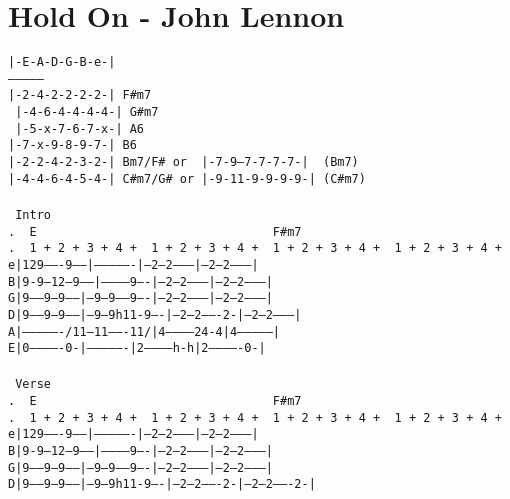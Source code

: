 \newpage
\section{Hold On - John Lennon}
\label{Hold On - John Lennon}
\texttt{|-E-A-D-G-B-e-|\\
---------------\\
|-2-4-2-2-2-2-| F\#m7\\\
|-4-6-4-4-4-4-| G\#m7\\\
|-5-x-7-6-7-x-| A6\ \ \\
|-7-x-9-8-9-7-| B6\ \ \\
|-2-2-4-2-3-2-| Bm7/F\# or\ \ |-7-9--7-7-7-7-|\ \ (Bm7)\\
|-4-4-6-4-5-4-| C\#m7/G\# or\ |-9-11-9-9-9-9-|\ (C\#m7)\\
\\
\lbrack\ Intro\rbrack\\
.\ \ E\ \ \ \ \ \ \ \ \ \ \ \ \ \ \ \ \ \ \ \ \ \ \ \ \ \ \ \ \ \ \ \ \ F\#m7\\
.\ \ 1\ +\ 2\ +\ 3\ +\ 4\ +\ \ 1\ +\ 2\ +\ 3\ +\ 4\ +\ \ 1\ +\ 2\ +\ 3\ +\ 4\ +\ \ 1\ +\ 2\ +\ 3\ +\ 4\ +\\
e|129-------9-----|----------------|--2---2---------|--2---2---------|\\
B|9-9---12--9-----|-----------9----|--2---2---------|--2---2---------|\\
G|9-----9---9-----|--9--9-----9----|--2---2---------|--2---2---------|\\
D|9-----9---9-----|--9---9h11-9----|--2---2-------2-|--2---2---------|\\
A|----------------/11--11-------11/|4-----------24-4|4---------------|\\
E|0-------------0-|----------------|2------------h-h|2-------------0-|\\
\\
\lbrack\ Verse\rbrack\\
.\ \ E\ \ \ \ \ \ \ \ \ \ \ \ \ \ \ \ \ \ \ \ \ \ \ \ \ \ \ \ \ \ \ \ \ F\#m7\\
.\ \ 1\ +\ 2\ +\ 3\ +\ 4\ +\ \ 1\ +\ 2\ +\ 3\ +\ 4\ +\ \ 1\ +\ 2\ +\ 3\ +\ 4\ +\ \ 1\ +\ 2\ +\ 3\ +\ 4\ +\\
e|129-------9-----|----------------|--2---2---------|--2---2---------|\\
B|9-9---12--9-----|-----------9----|--2---2---------|--2---2---------|\\
G|9-----9---9-----|--9--9-----9----|--2---2---------|--2---2---------|\\
D|9-----9---9-----|--9---9h11-9----|--2---2-------2-|--2---2-------2-|\\
}
